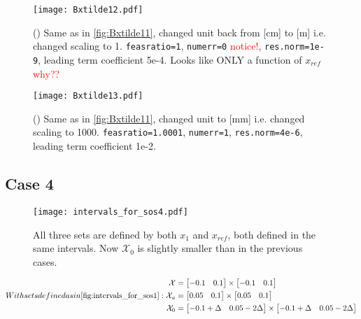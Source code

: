 \begin{figure}[H]
	\centering\texttt{[image: Bxtilde12.pdf]}
	\caption{() Same as in \autoref{fig:Bxtilde11}, changed unit back from [cm] to [m] i.e. changed scaling to 1. \texttt{feasratio=1}, \texttt{numerr=0} \textcolor{red}{notice!}, \texttt{res.norm=1e-9}, leading term coefficient 5e-4. Looks like ONLY a function of $x_{ref}$ \textcolor{red}{why??}}
	\label{fig:Bxtilde12}
\end{figure}

\begin{figure}[H]
	\centering\texttt{[image: Bxtilde13.pdf]}
	\caption{() Same as in \autoref{fig:Bxtilde11}, changed unit  to [mm] i.e. changed scaling to 1000. \texttt{feasratio=1.0001}, \texttt{numerr=1}, \texttt{res.norm=4e-6}, leading term coefficient 1e-2.}
	\label{fig:Bxtilde13}
\end{figure}





\newpage
\subsection{Case 4}\label{case4}
\begin{figure}[htbp]
\centering\texttt{[image: intervals\_for\_sos4.pdf]}
\caption{All three sets are defined by both $x_1$ and $x_{ref}$, both defined in the same intervals. Now $\mathcal{X}_0$ is slightly smaller than in the previous cases.}
\label{fig:intervals_for_sos4}
\end{figure}
\begin{subequations}\label{eq:sets_case4}
With sets defined as in \autoref{fig:intervals_for_sos1}:
\begin{align}
\mathcal{X} &= \begin{bmatrix} -0.1 & 0.1\end{bmatrix} \times \begin{bmatrix} -0.1 & 0.1\end{bmatrix}\\
\mathcal{X}_u &= \begin{bmatrix} 0.05 & 0.1\end{bmatrix} \times \begin{bmatrix} 0.05 & 0.1\end{bmatrix}\\
\mathcal{X}_0 &=\begin{bmatrix} -0.1+\Delta & 0.05-2\Delta\end{bmatrix} \times \begin{bmatrix} -0.1+\Delta & 0.05-2\Delta\end{bmatrix}
\end{align}
\end{subequations}

